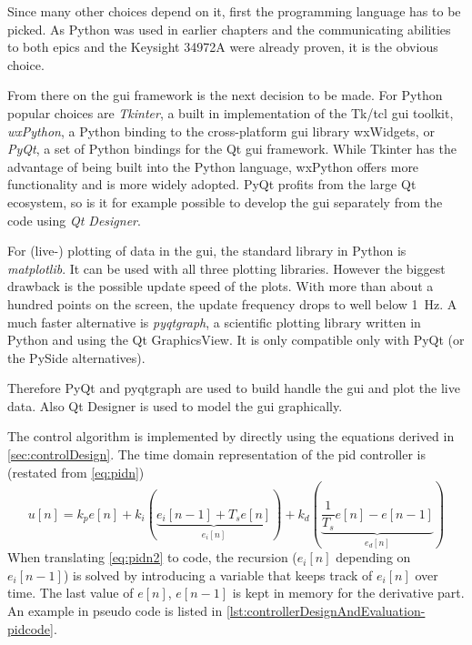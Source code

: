 Since many other choices depend on it, first the programming language has to be picked. As Python was used in earlier chapters and the communicating abilities to both \gls{epics} and the Keysight 34972A were already proven, it is the obvious choice. 

From there on the \gls{gui} framework is the next decision to be made. For Python popular choices are \textit{Tkinter}, a built in implementation of the Tk/tcl \gls{gui} toolkit, \textit{wxPython}, a Python binding to the cross-platform \gls{gui} library wxWidgets, or \textit{PyQt}\cite{pyqt}, a set of Python bindings for the Qt \gls{gui} framework\cite{qt}. While Tkinter has the advantage of being built into the Python language, wxPython offers more functionality and is more widely adopted. PyQt profits from the large Qt ecosystem, so is it for example possible to develop the \gls{gui} separately from the code using \textit{Qt Designer}.

For (live-) plotting of data in the \gls{gui}, the standard library in Python is \textit{matplotlib}\cite{Hunter2007}. It can be used with all three plotting libraries. However the biggest drawback is the possible update speed of the plots. With more than about a hundred points on the screen, the update frequency drops to well below \SI{1}{\hertz}. A much faster alternative is \textit{pyqtgraph}\cite{pyqtgraph}, a scientific plotting library written in Python and using the Qt GraphicsView. It is only compatible only with PyQt (or the PySide alternatives).

Therefore PyQt and pyqtgraph are used to build handle the \gls{gui} and plot the live data. Also Qt Designer is used to model the \gls{gui} graphically.

The control algorithm is implemented by directly using the equations derived in \autoref{sec:controlDesign}. The time domain representation of the \gls{pid} controller is (restated from \autoref{eq:pidn})
\begin{equation}\label{eq:pidn2}
u[n] = k_p e[n] 
+ k_i \left(\underbrace{e_i[n-1] + T_s e[n]}_{e_i[n]}\right) 
+ k_d \left(\underbrace{\frac{1}{T_s} e[n]-e[n-1]}_{e_d[n]}\right)
\end{equation}
When translating \autoref{eq:pidn2} to code, the recursion ($e_i[n]$ depending on $e_i[n-1]$) is solved by introducing a variable that keeps track of $e_i[n]$ over time. The last value of $e[n]$, $e[n-1]$ is kept in memory for the derivative part.
An example in pseudo code is listed in \autoref{lst:controllerDesignAndEvaluation-pidcode}.

